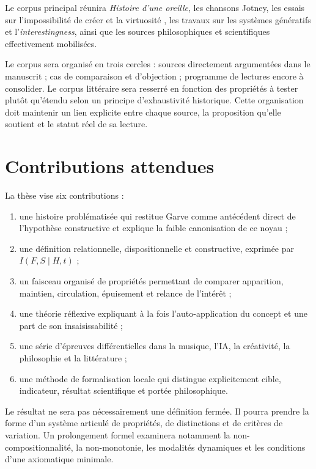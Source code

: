 \documentclass[11pt,a4paper]{article}
\begin{document}
Le corpus principal réunira \emph{Histoire d'une oreille}, les chansons Jotney,
les essais sur l'impossibilité de créer et la virtuosité
\parencite{pachet2018oreille,pachet2026impossibilite,pachet2027virtuosite}, les
travaux sur les systèmes génératifs et l'\emph{interestingness}, ainsi que les
sources philosophiques et scientifiques effectivement mobilisées.

Le corpus sera organisé en trois cercles : sources directement argumentées dans
le manuscrit ; cas de comparaison et d'objection ; programme de lectures encore
à consolider. Le corpus littéraire sera resserré en fonction des propriétés à
tester plutôt qu'étendu selon un principe d'exhaustivité historique. Cette
organisation doit maintenir un lien explicite entre chaque source, la
proposition qu'elle soutient et le statut réel de sa lecture.

\section{Contributions attendues}

La thèse vise six contributions :

\begin{enumerate}
  \item une histoire problématisée qui restitue Garve comme antécédent direct de
        l'hypothèse constructive et explique la faible canonisation de ce noyau ;
  \item une définition relationnelle, dispositionnelle et constructive,
        exprimée par \(I(F,S\mid H,t)\) ;
  \item un faisceau organisé de propriétés permettant de comparer apparition,
        maintien, circulation, épuisement et relance de l'intérêt ;
  \item une théorie réflexive expliquant à la fois l'auto-application du concept
        et une part de son insaisissabilité ;
  \item une série d'épreuves différentielles dans la musique, l'IA, la
        créativité, la philosophie et la littérature ;
  \item une méthode de formalisation locale qui distingue explicitement cible,
        indicateur, résultat scientifique et portée philosophique.
\end{enumerate}

Le résultat ne sera pas nécessairement une définition fermée. Il pourra prendre
la forme d'un système articulé de propriétés, de distinctions et de critères de
variation. Un prolongement formel examinera notamment la
non-compositionnalité, la non-monotonie, les modalités dynamiques et les
conditions d'une axiomatique minimale.
\end{document}

